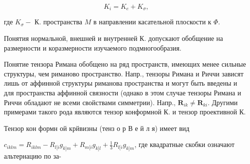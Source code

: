 \documentclass[10pt]{article}
\begin{document}
\[

K_{i}=K_{e}+K_{\sigma},

\]



где $K_{\sigma}-$ К. пространства $M$ в направлении касательной плоскости к $\Phi$.



Понятия нормальной, внешней и внутренней К. допускают обобщение на размерности и коразмерности изучаемого подмногообразия.



Понятие тензора Римана обобщено на ряд пространств, имеющих менее сильные структуры, чем риманово пространство. Напр., тензоры Римана и Риччи зависят лишь от аффинной структуры риманова пространства и могут быть введены и для пространства аффинной связности (однако в этом случае тензоры Римана и Риччи обладают не всеми свойствами симметрии). Напр., $\boldsymbol{R}_{i k} \neq \boldsymbol{R}_{k i}$. Другими примерами такого рода являются тензор конформной К. и тензор проективной К.



Тензор кон формн ой крйвизны (тенз о р В е й л я) имеет вид



$c_{i k l m}=R_{i k l m}-R_{l[i} g_{k] m}+R_{m[i} g_{k] l}+\frac{1}{3} R_{l[i} g_{k] m}$, где квадратные скобки означают альтернацию по за-
\end{document}
